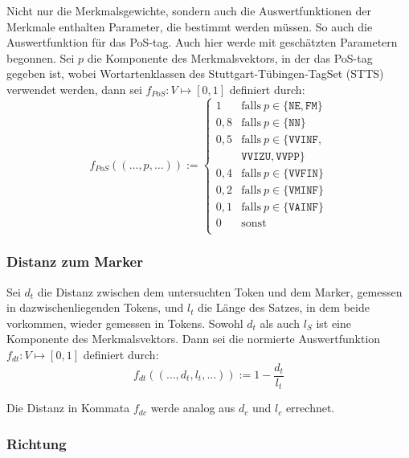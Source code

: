 \documentclass{article}
\begin{document}
Nicht nur die Merkmalsgewichte, sondern auch die Auswertfunktionen der
Merkmale enthalten Parameter, die bestimmt werden müssen. So auch die
Auswertfunktion für das PoS-tag. Auch hier werde mit geschätzten
Parametern begonnen.  Sei $p$ die Komponente des Merkmalsvektors, in
der das PoS-tag gegeben ist, wobei Wortartenklassen des
Stuttgart-Tübingen-TagSet (STTS) \parencite{Schiller1999a} verwendet
werden, dann sei $f_{PoS}:V\mapsto [0,1]$ definiert durch:
\begin{equation}
  \label{eq:pos}
  f_{PoS}((\dots,p,\dots)) := \left\{
    \begin{array}{ll}
      1 & \mathrm{falls~} p \in \{\mathtt{NE,FM}\} \\
      0,8 & \mathrm{falls~} p \in \{\mathtt{NN}\} \\
      0,5 & \mathrm{falls~} p \in \{\mathtt{VVINF,}\\ ~ & \mathtt{VVIZU,VVPP}\} \\
      0,4 & \mathrm{falls~} p \in \{\mathtt{VVFIN}\} \\
      0,2 & \mathrm{falls~} p \in \{\mathtt{VMINF}\} \\
      0,1 & \mathrm{falls~} p \in \{\mathtt{VAINF}\} \\
      0 & \mathrm{sonst} \\
    \end{array}\right.
\end{equation}


\subsubsection{Distanz zum Marker}

Sei $d_t$ die Distanz zwischen dem untersuchten Token und dem Marker,
gemessen in dazwischenliegenden Tokens, und $l_t$ die Länge des
Satzes, in dem beide vorkommen, wieder gemessen in Tokens. Sowohl
$d_t$ als auch $l_S$ ist eine Komponente des Merkmalsvektors. Dann sei
die normierte Auswertfunktion $f_{dt}:V\mapsto [0,1]$ definiert durch:
\begin{equation}
  \label{eq:tokendistance}
  f_{dt}((\dots,d_t,l_t,\dots)):=1-\frac{d_t}{l_t} 
\end{equation}

Die Distanz in Kommata $f_{dc}$ werde analog aus $d_c$ und $l_c$
errechnet.


\subsubsection{Richtung}
\end{document}
